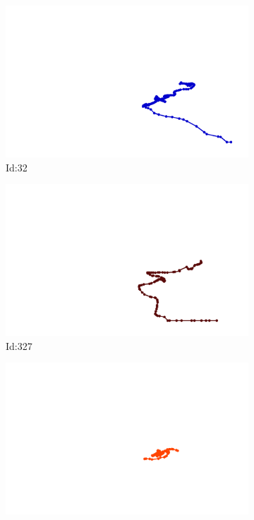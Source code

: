 \documentclass[12pt,twoside]{report}
\begin{document}
\begin{figure}
\centering
\begin{subfigure}[b]{0.20\textwidth}
\centering
\includegraphics[width=\textwidth]{../../trajectories/32.png}
\caption{Id:32}
\end{subfigure}
\begin{subfigure}[b]{0.20\textwidth}
\centering
\includegraphics[width=\textwidth]{../../trajectories/327.png}
\caption{Id:327}
\end{subfigure}
\begin{subfigure}[b]{0.20\textwidth}
\centering
\includegraphics[width=\textwidth]{../../trajectories/461.png}

\end{subfigure}
\end{figure}
\end{document}
